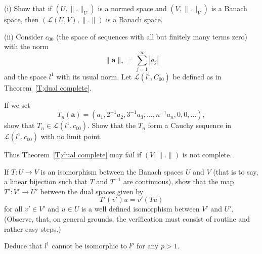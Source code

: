 \begin{exercise}\label{E;more dual complete}\label{C1.8}
(i) Show that if $(U,\|.\|_{U})$ is a normed space and
$(V,\|.\|_{V})$ is a Banach space, then
$({\mathcal L}(U,V),\|.\|)$ is a Banach space.

(ii) Consider $c_{00}$ (the space of sequences with 
all but finitely many terms zero) with the norm
\[\|{\mathbf a}\|_{*}=\sum_{j=1}^{\infty}|a_{j}|\]
and the space $l^{1}$ with its usual norm. Let
${\mathcal L}(l^{1},C_{00})$
be defined as in Theorem~\ref{T;dual complete}.

If we
set
\[T_{n}({\mathbf a})=(a_{1},2^{-1}a_{2},3^{-1}a_{3},\dots,n^{-1}a_{n},
0,0,\dots),\]
show that
$T_{n}\in {\mathcal L}(l^{1},c_{00})$. Show that the $T_{n}$ form a Cauchy sequence
in ${\mathcal L}(l^{1},c_{00})$ with no limit point.

Thus Theorem~\ref{T;dual complete} may fail if $(V,\|.\|)$ is
not complete.
\end{exercise}
\begin{exercise}\label{E;not $l^{1}$}\label{C1.9}
If $T:U\rightarrow V$ is an isomorphism
between the Banach spaces $U$ and $V$ (that is to say, a linear
bijection such that $T$ and $T^{-1}$ are continuous),
show that the map $T':V'\rightarrow U'$ between the
dual spaces given by
\[T'(v')u=v'(Tu)\]
for all $v'\in V'$ and $u\in U$ is a well defined isomorphism between
$V'$ and $U'$. (Observe, that, on general grounds, the verification
must consist of routine and rather easy steps.)

Deduce that $l^{1}$ cannot be isomorphic to $l^{p}$ for any $p>1$.
\end{exercise} 


